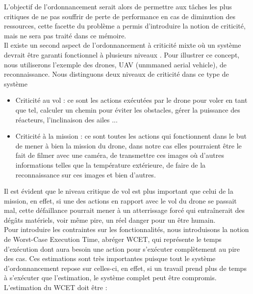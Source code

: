\documentclass[a4paper]{report}
\theoremstyle{break}
\begin{document}
L'objectif de l'ordonnancement serait alors de permettre aux tâches les plus critiques de ne pas souffrir de perte de performance en cas de diminution des ressources, cette facette du problème a permis d'introduire la notion de criticité, mais ne sera pas traité dans ce mémoire.\\

Il existe un second aspect de l'ordonnancement à criticité mixte où un système devrait être garanti fonctionnel à plusieurs niveaux \cite{barhorst2009research}. Pour illustrer ce concept, nous utiliserons l'exemple des drones, UAV (unmmaned aerial vehicle), de reconnaissance. Nous distinguons deux niveaux de criticité dans ce type de système

\begin{itemize}
\item Criticité au vol : ce sont les actions exécutées par le drone pour voler en tant que tel, calculer un chemin pour éviter les obstacles, gérer la puissance des réacteurs, l'inclinaison des ailes ...
\item Criticité à la mission : ce sont toutes les actions qui fonctionnent dans le but de mener à bien la mission du drone, dans notre cas elles pourraient être le fait de filmer avec une caméra, de transmettre ces images où d'autres informations telles que la température extérieure, de faire de la reconnaissance sur ces images et bien d'autres.
\end{itemize}

Il est évident que le niveau critique de vol est plus important que celui de la mission, en effet, si une des actions en rapport avec le vol du drone se passait mal, cette défaillance pourrait mener à un atterrissage forcé qui entraînerait des dégâts matériels, voir même pire, un réel danger pour un être humain.\\

Pour introduire les contraintes sur les fonctionnalités, nous introduisons la notion de Worst-Case Execution Time, abréger WCET, qui représente le temps d'exécution dont aura besoin une action pour s'exécuter complètement au pire des cas. Ces estimations sont très importantes puisque tout le système d'ordonnancement repose sur celles-ci, en effet, si un travail prend plus de temps à s'exécuter que l'estimation, le système complet peut être compromis. L'estimation du WCET doit être \cite{santy2012ordonnancement} :
\end{document}
